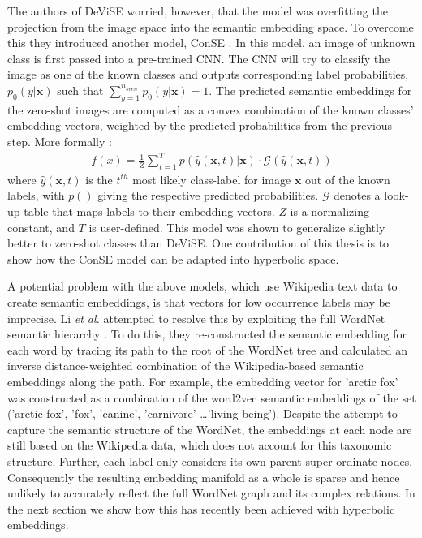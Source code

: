 \documentclass[12pt]{report}
\begin{document}
The authors of DeViSE worried, however, that the model was overfitting the projection from the image space into the semantic embedding space. To overcome this they introduced another model, ConSE \cite{Norouzi2013}. In this model, an image of unknown class is first passed into a pre-trained CNN. The CNN will try to classify the image as one of the known classes and outputs corresponding label probabilities, $p_0 (y | \mathbf{x})$ such that $\sum_{y=1}^{n_{seen}} p_0 (y | \mathbf{x}) = 1$. The predicted semantic embeddings for the zero-shot images are computed as a convex combination of the known classes' embedding vectors, weighted by the predicted probabilities from the previous step. More formally \cite{Norouzi2013}:
\begin{align}
  f(x) = \frac{1}{Z}\sum_{t=1}^T p(\hat{y}(\mathbf{x}, t)| \mathbf{x}) \cdot \mathcal{G}(\hat{y}(\mathbf{x}, t))
\end{align}
where $\hat{y}(\mathbf{x}, t)$ is the $t^{th}$ most likely class-label for image $\mathbf{x}$ out of the known labels, with $p()$ giving the respective predicted probabilities. $\mathcal{G}$ denotes a look-up table that maps labels to their embedding vectors. $Z$ is a normalizing constant, and $T$ is user-defined. This model was shown to generalize slightly better to zero-shot classes than DeViSE. One contribution of this thesis is to show how the ConSE model can be adapted into hyperbolic space.

A potential problem with the above models, which use Wikipedia text data to create semantic embeddings, is that vectors for low occurrence labels may be imprecise. Li \textit{et al.} \cite{Li2015} attempted to resolve this by exploiting the full WordNet semantic hierarchy \cite{Miller1995}. To do this, they re-constructed the semantic embedding for each word by tracing its path to the root of the WordNet tree and calculated an inverse distance-weighted combination of the Wikipedia-based semantic embeddings along the path. For example, the embedding vector for 'arctic fox' was constructed as a combination of the word2vec semantic embeddings of the set ('arctic fox', 'fox', 'canine', 'carnivore' \dots 'living being'). Despite the attempt to capture the semantic structure of the WordNet, the embeddings at each node are still based on the Wikipedia data, which does not account for this taxonomic structure. Further, each label only considers its own parent super-ordinate nodes. Consequently the resulting embedding manifold as a whole is sparse and hence unlikely to accurately reflect the full WordNet graph and its complex relations. In the next section we show how this has recently been achieved with hyperbolic embeddings.
\end{document}
